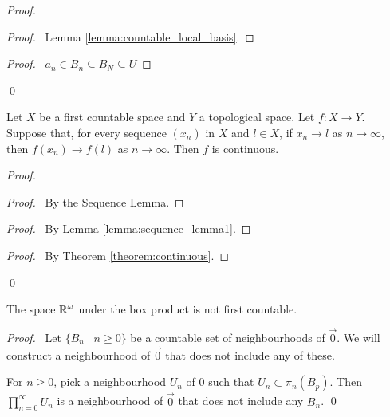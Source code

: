 \begin{proof}
    \pf
    \begin{proof}
        \pf\ Lemma \ref{lemma:countable_local_basis}.
    \end{proof}
    \begin{proof}
        \pf\ $a_n \in B_n \subseteq B_N \subseteq U$
    \end{proof}
    \qed
\end{proof}

\begin{theorem}[CC]
    Let $X$ be a first countable space and $Y$ a topological space. Let $f : X \rightarrow Y$. Suppose that, for every sequence $(x_n)$ in $X$ and $l \in X$, if $x_n \rightarrow l$
    as $n \rightarrow \infty$, then $f(x_n) \rightarrow f(l)$ as $n \rightarrow \infty$. Then $f$ is continuous.
\end{theorem}

\begin{proof}
    \pf
    \begin{proof}
        \pf\ By the Sequence Lemma.
    \end{proof}
    \begin{proof}
        \pf\ By Lemma \ref{lemma:sequence_lemma1}.
    \end{proof}
    \qedstep
    \begin{proof}
        \pf\ By Theorem \ref{theorem:continuous}.
    \end{proof}
    \qed
\end{proof}

\begin{example}[CC]
    The space $\mathbb{R}^\omega$ under the box product is not first countable.
\end{example}

\begin{proof}
    \pf\ Let $\{ B_n \mid n \geq 0 \}$ be a countable set of neighbourhoods of $\vec{0}$. We will construct a neighbourhood of $\vec{0}$ that does not include any of these.

    For $n \geq 0$, pick a neighbourhood $U_n$ of 0 such that $U_n \subset \pi_n(B_p)$. Then $\prod_{n=0}^\infty U_n$ is a neighbourhood of $\vec{0}$ that does not
    include any $B_n$. \qed
\end{proof}

